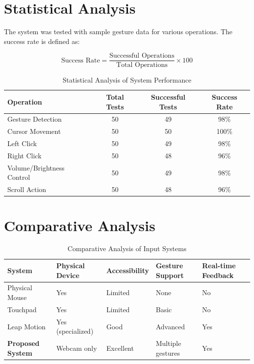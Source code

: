 \documentclass[12pt,a4paper]{report}
\begin{document}
\begin{enumerate}
\section{Statistical Analysis}

The system was tested with sample gesture data for various operations. The success rate is
defined as:

\[
  \text{Success Rate} = \frac{\text{Successful Operations}}{\text{Total Operations}} \times 100
\]

\begin{table}[ht]
\centering
\caption{Statistical Analysis of System Performance}
\label{tab:statistical}
\begin{tabular}{|l|c|c|c|}
\hline
\textbf{Operation} & \textbf{Total Tests} & \textbf{Successful Tests} & \textbf{Success Rate} \\
\hline
Gesture Detection          & 50 & 49 & 98\%  \\
\hline
Cursor Movement            & 50 & 50 & 100\% \\
\hline
Left Click                 & 50 & 49 & 98\%  \\
\hline
Right Click                & 50 & 48 & 96\%  \\
\hline
Volume/Brightness Control  & 50 & 49 & 98\%  \\
\hline
Scroll Action              & 50 & 48 & 96\%  \\
\hline
\end{tabular}
\end{table}

\section{Comparative Analysis}

\begin{table}[ht]
\centering
\caption{Comparative Analysis of Input Systems}
\label{tab:comparative}
\begin{tabular}{|p{2.5cm}|p{2.5cm}|p{2.5cm}|p{2.5cm}|p{2.5cm}|}
\hline
\textbf{System} & \textbf{Physical Device} & \textbf{Accessibility} & \textbf{Gesture Support} & \textbf{Real-time Feedback} \\
\hline
Physical Mouse
& Yes
& Limited
& None
& No \\
\hline
Touchpad
& Yes
& Limited
& Basic
& No \\
\hline
Leap Motion
& Yes (specialized)
& Good
& Advanced
& Yes \\
\hline
\textbf{Proposed System}
& Webcam only
& Excellent
& Multiple gestures
& Yes \\
\hline
\end{tabular}
\end{table}


\end{enumerate}
\end{document}
